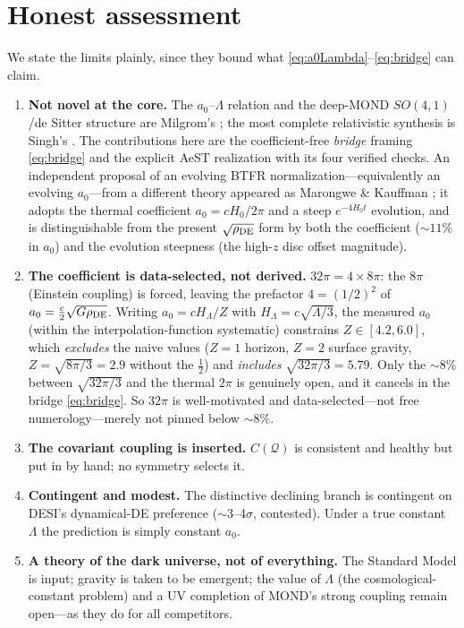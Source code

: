 \documentclass[11pt]{article}
\newcommand{\az}{a_0}
\newcommand{\rde}{\rho_{\rm DE}}
\begin{document}
\section{Honest assessment}
\label{sec:honest}
We state the limits plainly, since they bound what \eqref{eq:a0Lambda}--\eqref{eq:bridge} can claim.
\begin{enumerate}\itemsep1pt
\item \textbf{Not novel at the core.} The $\az$--$\Lambda$ relation and the deep-MOND $SO(4,1)$/de Sitter structure
are Milgrom's \cite{Milgrom1999,Milgrom2009}; the most complete relativistic synthesis is Singh's \cite{Singh2026}.
The contributions here are the coefficient-free \emph{bridge} framing \eqref{eq:bridge} and the explicit AeST
realization with its four verified checks. An independent proposal of an evolving BTFR normalization---equivalently
an evolving $\az$---from a different theory appeared as Marongwe \& Kauffman \cite{MarongweKauffman2025}; it adopts
the thermal coefficient $\az=cH_0/2\pi$ and a steep $e^{-4H_0t}$ evolution, and is distinguishable from the present
$\sqrt{\rde}$ form by both the coefficient (${\sim}11\%$ in $\az$) and the evolution steepness (the high-$z$ disc
offset magnitude).
\item \textbf{The coefficient is data-selected, not derived.} $32\pi=4\times8\pi$: the $8\pi$ (Einstein coupling) is
forced, leaving the prefactor $4=(1/2)^2$ of $\az=\tfrac{c}{2}\sqrt{G\rde}$. Writing $\az=cH_\Lambda/Z$ with
$H_\Lambda=c\sqrt{\Lambda/3}$, the measured $\az$ (within the interpolation-function systematic) constrains
$Z\in[4.2,6.0]$, which \emph{excludes} the naive values ($Z=1$ horizon, $Z=2$ surface gravity, $Z=\sqrt{8\pi/3}=2.9$
without the $\tfrac12$) and \emph{includes} $\sqrt{32\pi/3}=5.79$. Only the ${\sim}8\%$ between $\sqrt{32\pi/3}$ and
the thermal $2\pi$ is genuinely open, and it cancels in the bridge \eqref{eq:bridge}. So $32\pi$ is well-motivated and
data-selected---not free numerology---merely not pinned below ${\sim}8\%$.
\item \textbf{The covariant coupling is inserted.} $C(\mathcal{Q})$ is consistent and healthy but put in by hand; no
symmetry selects it.
\item \textbf{Contingent and modest.} The distinctive declining branch is contingent on DESI's dynamical-DE
preference ($\sim$3--4$\sigma$, contested). Under a true constant $\Lambda$ the prediction is simply constant $\az$.
\item \textbf{A theory of the dark universe, not of everything.} The Standard Model is input; gravity is taken to be
emergent; the value of $\Lambda$ (the cosmological-constant problem) and a UV completion of MOND's strong coupling
remain open---as they do for all competitors.
\end{enumerate}
\end{document}

